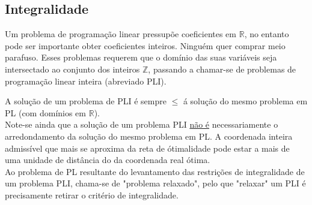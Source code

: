 \documentclass[]{report}
\begin{document}
\subsection{Integralidade}
Um problema de programação linear pressupõe coeficientes em $\mathbb{R}$, no entanto pode ser importante obter coeficientes inteiros. Ninguém quer comprar meio parafuso. Esses problemas requerem que o domínio das suas variáveis seja intersectado ao conjunto dos inteiros $\mathbb{Z}$, passando a chamar-se de problemas de programação linear inteira (abreviado PLI).\\ \par
A solução de um problema de PLI é sempre $\leq$ á solução do mesmo problema em PL (com domínios em $\mathbb{R}$).\\
Note-se ainda que a solução de um problema PLI \underline{não é} necessariamente o arredondamento da solução do mesmo problema em PL. A coordenada inteira admissível que mais se aproxima da reta de ótimalidade pode estar a mais de uma unidade de distância do da coordenada real ótima.\\[0.5cm]
Ao problema de PL resultante do levantamento das restrições de integralidade de um problema PLI, chama-se de "problema relaxado", pelo que "relaxar" um PLI é precisamente retirar o critério de integralidade.
\end{document}
